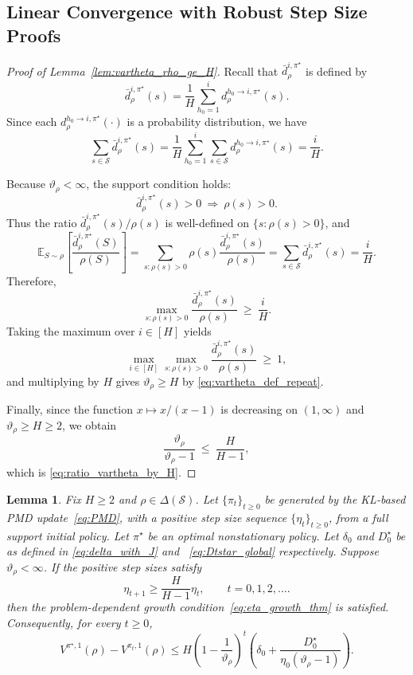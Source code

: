 \documentclass[11pt]{article}
\newtheorem{lem}{Lemma}
\begin{document}
\subsection{Linear Convergence with Robust Step Size Proofs} \label{app:linrobust}
\begin{proof}[Proof of Lemma~\ref{lem:vartheta_rho_ge_H}]
 Recall that $\bar d^{i,\pi^\star}_\rho$ is defined by
\[
\bar d^{i,\pi^\star}_\rho(s)=\frac{1}{H}\sum_{h_0=1}^i d^{h_0\to i,\pi^\star}_\rho(s).
\]
Since each $d^{h_0\to i,\pi^\star}_\rho(\cdot)$ is a probability distribution, we have
\[
\sum_{s\in\mathcal S}\bar d^{i,\pi^\star}_\rho(s)
=\frac{1}{H}\sum_{h_0=1}^i\sum_{s\in\mathcal S} d^{h_0\to i,\pi^\star}_\rho(s)
=\frac{i}{H}.
\]

Because $\vartheta_\rho<\infty$, the support condition holds:
\[
\bar d^{i,\pi^\star}_\rho(s)>0 \ \Longrightarrow\ \rho(s)>0.
\]
Thus the ratio $\bar d^{i,\pi^\star}_\rho(s)/\rho(s)$ is well-defined on $\{s:\rho(s)>0\}$, and
\[
\mathbb E_{S\sim \rho}\!\left[\frac{\bar d^{i,\pi^\star}_\rho(S)}{\rho(S)}\right]
=\sum_{s:\rho(s)>0}\rho(s)\frac{\bar d^{i,\pi^\star}_\rho(s)}{\rho(s)}
=\sum_{s\in\mathcal S}\bar d^{i,\pi^\star}_\rho(s)
=\frac{i}{H}.
\]
Therefore,
\[
\max_{s:\rho(s)>0}\frac{\bar d^{i,\pi^\star}_\rho(s)}{\rho(s)}
\ \ge\ \frac{i}{H}.
\]
Taking the maximum over $i\in[H]$ yields
\[
\max_{i\in[H]}\max_{s:\rho(s)>0}\frac{\bar d^{i,\pi^\star}_\rho(s)}{\rho(s)}
\ \ge\ 1,
\]
and multiplying by $H$ gives $\vartheta_\rho\ge H$ by \eqref{eq:vartheta_def_repeat}.

Finally, since the function $x\mapsto x/(x-1)$ is decreasing on $(1,\infty)$ and $\vartheta_\rho\ge H\ge 2$, we obtain
\[
\frac{\vartheta_\rho}{\vartheta_\rho-1}\ \le\ \frac{H}{H-1},
\]
which is \eqref{eq:ratio_vartheta_by_H}.
\end{proof}

\begin{lem}
\label{lem:horizon_only_growth_sufficient}
Fix $H\ge2$ and $\rho\in\Delta(\mathcal S)$. Let
$\{\pi_t\}_{t\ge0}$ be generated by the KL-based PMD
update~\eqref{eq:PMD}, with a positive step size sequence
$\{\eta_t\}_{t\ge0}$, from a full support initial policy. Let
$\pi^\star$ be an optimal nonstationary policy. Let
$\delta_0$ and $D_0^\star$ be as defined
in \eqref{eq:delta_with_J} and ~\eqref{eq:Dtstar_global} respectively. Suppose $\vartheta_\rho<\infty$. If the positive step sizes satisfy
\begin{equation}
\label{eq:eta_growth_H_lem}
\eta_{t+1}
\ge
\frac{H}{H-1}\eta_t,
\qquad t=0,1,2,\ldots.
\end{equation}
then the problem-dependent growth
condition~\eqref{eq:eta_growth_thm} is satisfied. Consequently, for
every $t\ge0$,
\begin{equation}
\label{eq:horizon_only_general_bound}
V^{\pi^\star,1}(\rho)-V^{\pi_t,1}(\rho)
\le
H\left(1-\frac{1}{\vartheta_\rho}\right)^t
\left(
\delta_0+
\frac{D_0^\star}{\eta_0(\vartheta_\rho-1)}
\right).
\end{equation}
\end{lem}
\end{document}
